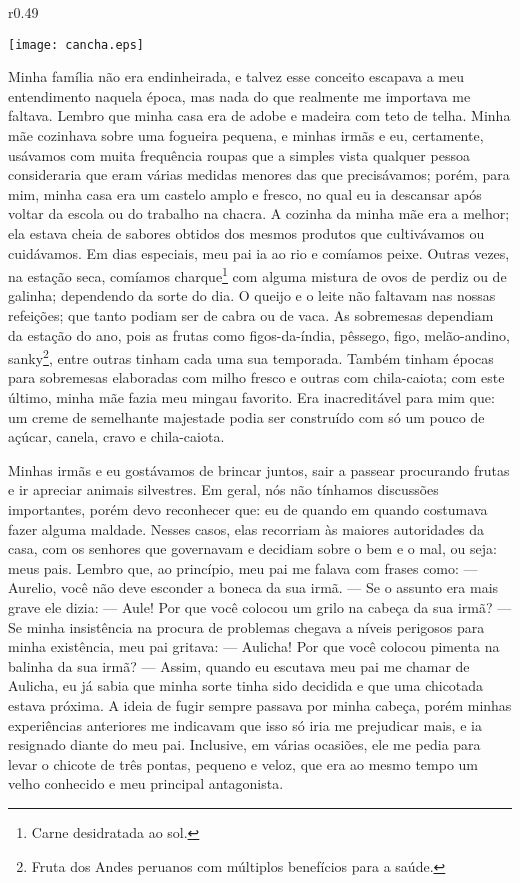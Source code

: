\begin{wrapfigure}{r}{0.49\textwidth}
  \begin{center}
  \vspace{-20pt}
    \texttt{[image: cancha.eps]}
  \end{center}
  \vspace{-20pt}
\end{wrapfigure}
Minha família não era endinheirada, e talvez esse conceito escapava a meu entendimento naquela época, mas nada do que realmente me importava me faltava.
Lembro que minha casa era de adobe e madeira com teto de telha. Minha mãe cozinhava sobre uma fogueira pequena, e minhas irmãs e eu, certamente, usávamos com muita frequência roupas que a simples vista qualquer pessoa consideraria que eram várias medidas menores das que precisávamos;
porém, para mim, minha casa era um castelo amplo e fresco, no qual eu ia descansar após voltar da escola ou do trabalho na chacra. 
A cozinha da minha mãe era a melhor; ela estava cheia de sabores obtidos dos mesmos produtos que cultivávamos ou cuidávamos. 
Em dias especiais, meu pai ia ao rio e comíamos peixe. Outras vezes, na estação seca, comíamos charque\footnote{Carne desidratada ao sol.} com alguma mistura de ovos de perdiz ou de galinha; dependendo da sorte do dia.
O queijo e o leite não faltavam nas nossas refeições; que tanto podiam ser de cabra ou de vaca.
As sobremesas dependiam da estação do ano, pois as frutas como figos-da-índia, pêssego, figo, melão-andino, sanky\footnote{Fruta dos Andes peruanos com múltiplos benefícios para a saúde.}, entre outras tinham cada uma sua temporada. Também tinham épocas para sobremesas elaboradas com milho fresco e outras com chila-caiota; com este último, minha mãe fazia meu mingau favorito. Era inacreditável para mim que: um creme de semelhante majestade podia ser construído com só um pouco de açúcar, canela, cravo e chila-caiota.

Minhas irmãs e eu gostávamos de brincar juntos, sair a passear procurando frutas e ir apreciar animais silvestres. Em geral, nós não tínhamos discussões importantes, porém devo reconhecer que: eu de quando em quando costumava fazer alguma maldade.
Nesses casos, elas recorriam às maiores autoridades da casa, com os senhores que governavam e decidiam sobre o bem e o mal, ou seja: meus pais. 
Lembro que, ao princípio, meu pai me falava com frases como: 
--- Aurelio, você não deve esconder a boneca da sua irmã. --- 
Se o assunto era mais grave ele dizia: 
--- Aule! Por que você colocou um grilo na cabeça da sua irmã? --- 
Se minha insistência na procura de problemas chegava a níveis perigosos para minha existência, meu pai gritava: 
--- Aulicha! Por que você colocou pimenta na balinha da sua irmã? ---
Assim, quando eu escutava meu pai me chamar de Aulicha, eu já sabia que minha sorte tinha sido decidida e que uma chicotada estava próxima. A ideia de fugir sempre passava por minha cabeça, porém minhas experiências anteriores me indicavam que isso só iria me prejudicar mais, e ia resignado diante do meu pai. Inclusive, em várias ocasiões, ele me pedia para levar o chicote de três pontas, pequeno e veloz, que era ao mesmo tempo um velho conhecido e meu principal antagonista.

